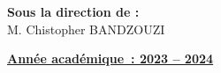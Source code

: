 \begin{titlepage}
\begin{minipage}[t]{0.45\textwidth}
  \end{minipage}
  \hfill
  \begin{minipage}[t]{0.45\textwidth}
    \raggedleft
    \large{
      \textbf{
        Sous la direction de : \\
      }
      M. Chistopher BANDZOUZI
    }
  \end{minipage}

  \vspace{1.5cm}
  \begin{center}
    \large {
      \textbf { \underline {Année académique : 2023 – 2024} }
    }

    \vspace*{\fill}
  \end{center}


\end{titlepage}
